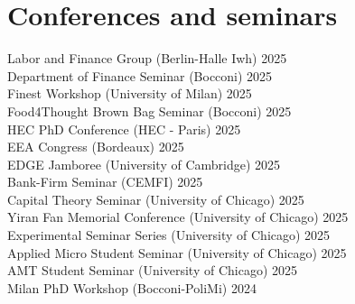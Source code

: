 \documentclass[A4,11pt]{article}
\begin{document}
\section{Conferences and seminars}
\hspace{12pt} Labor and Finance Group (Berlin-Halle Iwh) \hfill 2025\\
\smallskip
\hspace{12pt} Department of Finance Seminar (Bocconi) \hfill 2025\\
\smallskip
\hspace{12pt} Finest Workshop (University of Milan)  \hfill 2025\\
\smallskip
\hspace{12pt} Food4Thought Brown Bag Seminar (Bocconi) \hfill 2025\\
\smallskip
\hspace{12pt} HEC PhD Conference (HEC - Paris) \hfill 2025\\
\smallskip
\hspace{12pt} EEA Congress (Bordeaux) \hfill 2025\\
\smallskip
\hspace{12pt} EDGE Jamboree (University of Cambridge) \hfill 2025\\
\smallskip
\hspace{12pt} Bank-Firm Seminar (CEMFI) \hfill 2025\\
\smallskip
\hspace{12pt} Capital Theory Seminar (University of Chicago) \hfill 2025\\
\smallskip
\hspace{12pt} Yiran Fan Memorial Conference (University of Chicago) \hfill 2025\\
\smallskip
\hspace{12pt} Experimental Seminar Series (University of Chicago) \hfill 2025\\
\smallskip
\hspace{12pt} Applied Micro Student Seminar (University of Chicago) \hfill 2025\\
\smallskip
\hspace{12pt} AMT Student Seminar (University of Chicago) \hfill 2025\\
\smallskip
\hspace{12pt} Milan PhD Workshop (Bocconi-PoliMi) \hfill 2024\\
\end{document}
